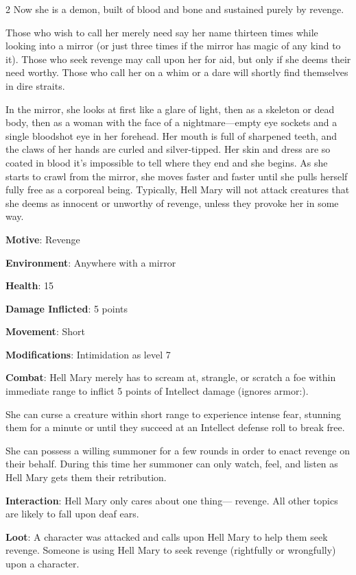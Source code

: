 \begin{multicols}{2}
Now she is a demon, built of blood and bone and sustained purely by revenge. 

Those who wish to call her merely need say her name thirteen times while looking into a mirror (or just three times if the mirror has magic of any kind to it). 
Those who seek revenge may call upon her for aid, but only if she deems their need worthy. Those who call her on a whim or a dare will shortly find themselves in dire straits. 

In the mirror, she looks at first like a glare of light, then as a skeleton or dead body, then as a woman with the face of a nightmare—empty eye sockets and a single bloodshot eye in her forehead. Her mouth is full of sharpened teeth, and the claws of her hands are curled and silver-tipped. Her skin and dress are so coated in blood it’s impossible to tell where they end and she begins. As she starts to crawl from the mirror, she moves faster and faster until she pulls herself fully free as a corporeal being. Typically, Hell Mary will not attack creatures that she deems as innocent or unworthy of revenge, unless they provoke her in some way.

\textbf{Motive}: Revenge 

\textbf{Environment}: Anywhere with a mirror 

\textbf{Health}: 15 

\textbf{Damage Inflicted}: 5 points 

\textbf{Movement}: Short 

\textbf{Modifications}: Intimidation as level 7 

\textbf{Combat}: Hell Mary merely has to scream at, strangle, or scratch a foe within immediate range to inflict 5 points of Intellect damage (ignores armor:). 

She can curse a creature within short range to experience intense fear, stunning them for a minute or until they succeed at an Intellect defense roll to break free. 

She can possess a willing summoner for a few rounds in order to enact revenge on their behalf. During this time her summoner can only watch, feel, and listen as Hell Mary gets them their retribution. 

\textbf{Interaction}: Hell Mary only cares about one thing— revenge. All other topics are likely to fall upon deaf ears. 

\textbf{Loot}: A character was attacked and calls upon Hell Mary to help them seek revenge. Someone is using Hell Mary to seek revenge (rightfully or wrongfully) upon a character.


\end{multicols}

